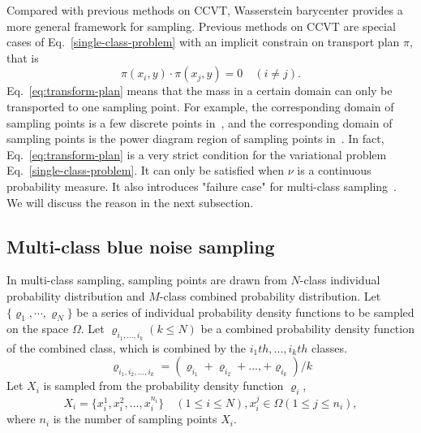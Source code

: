 Compared with previous methods on CCVT,
Wasserstein barycenter provides a more general framework for sampling.
Previous methods on CCVT are special cases of Eq.~\ref{single-class-problem} with an implicit constrain on  transport plan $\pi$,
that is
\begin{equation}\label{eq:transform-plan}
  \pi(x_i,y)\cdot\pi(x_j,y)=0 \quad(i\neq j).
\end{equation}
Eq.~\ref{eq:transform-plan} means that the mass in a certain domain can only be transported to one sampling point.
For example,
the corresponding domain of sampling points is a few discrete points in~\cite{balzer:2009:capacity},
and the corresponding domain of sampling points is the power diagram region of sampling points in~\cite{de:2012:blue}.
In fact,
Eq.~\ref{eq:transform-plan} is a very strict condition for the variational problem Eq.~\ref{single-class-problem}.
It can only be satisfied when $\nu$ is a continuous probability measure.
It also introduces "failure case" for multi-class sampling~\cite{wei:2010:multi}.
We will discuss the reason in the next subsection.

\subsection{Multi-class blue noise sampling}
In multi-class sampling,
sampling points are drawn from $N$-class individual probability distribution
and $M$-class combined probability distribution.
Let $\{\varrho_1,\cdots,\varrho_N\}$ be a series of individual probability density functions
to be sampled on the space $\Omega$.
Let $\varrho_{i_1,...,i_k}(k\leq N)$
be a combined probability density function of the combined class,
which is combined by the $i_1th,...,i_kth$ classes.
\begin{equation*}
\varrho_{i_1,i_2,...,i_k}=(\varrho_{i_1}+\varrho_{i_2}+...,+\varrho_{i_k})/k
\end{equation*}
Let $X_i$ is sampled from the probability density function $\varrho_i$,
\begin{equation*}
  X_i=\{x_i^1,x_i^2,...,x_i^{n_i}\}\quad(1\leq i\leq N), x_i^j\in\Omega(1\leq j\leq n_i),
\end{equation*}
where $n_i$ is the number of sampling points $X_i$.

